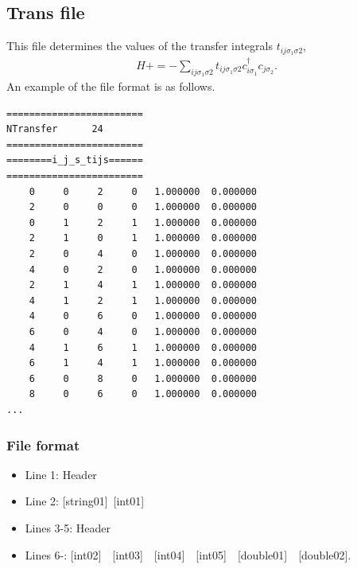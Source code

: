 \newpage
\subsection{Trans file}
\label{Subsec:Trans}
This file determines the values of the transfer integrals $t_{ij\sigma_1\sigma2}$,
\begin{align}
H +=-\sum_{ij\sigma_1\sigma2} t_{ij\sigma_1\sigma2}c_{i\sigma_1}^{\dag}c_{j\sigma_2}.
\end{align}
An example of the file format is as follows.\\
\begin{minipage}{12.5cm}
\begin{screen}
\begin{verbatim}
======================== 
NTransfer      24  
======================== 
========i_j_s_tijs====== 
======================== 
    0     0     2     0   1.000000  0.000000
    2     0     0     0   1.000000  0.000000
    0     1     2     1   1.000000  0.000000
    2     1     0     1   1.000000  0.000000
    2     0     4     0   1.000000  0.000000
    4     0     2     0   1.000000  0.000000
    2     1     4     1   1.000000  0.000000
    4     1     2     1   1.000000  0.000000
    4     0     6     0   1.000000  0.000000
    6     0     4     0   1.000000  0.000000
    4     1     6     1   1.000000  0.000000
    6     1     4     1   1.000000  0.000000
    6     0     8     0   1.000000  0.000000
    8     0     6     0   1.000000  0.000000
...
\end{verbatim}
\end{screen}
\end{minipage}

\subsubsection{File format}
\begin{itemize}
   \item  Line 1:  Header
   \item  Line 2:   [string01]~[int01]
   \item  Lines 3-5:  Header
   \item  Lines 6-: [int02]~~[int03]~~[int04]~~[int05]~~[double01]~~[double02].
  \end{itemize}
